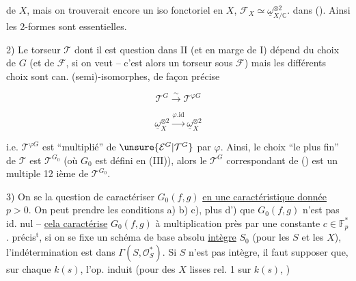 
 de $X$, mais on trouverait encore un iso fonctoriel en $X$, $\mathcal F_X\simeq\underline\omega^{\otimes2}_{X/\mathbb C}$.   dans (). Ainsi les 2-formes sont essentielles.

2)  Le torseur $\mathcal T$ dont il est question dans II (et en marge de I) dépend du choix de $G$ (et de $\mathcal F$, si on veut -- c'est alors un torseur sous $\mathcal F$) mais les  différents choix sont can. (semi)-isomorphes, de façon précise

\[
\mathcal T^G\xrightarrow{\sim}\mathcal T^{\varphi G}
\]


\[
\underline\omega_X^{\otimes2}\xrightarrow{\varphi.\mathrm{id}}\underline\omega_X^{\otimes2}
\]

i.e. $\mathcal T^{\varphi G}$ est ``multiplié'' de $\unsure{\mathcal E^G|\mathcal T^G}$ par $\varphi$. Ainsi, le choix ``le plus fin'' de $\mathcal T$ est $\mathcal T^{G_0}$ (où $G_0$ est défini en (III)), alors le $\mathcal T^G$ correspondant   de () est un multiple 12 ième de $\mathcal T^{G_0}$.

3) On  se   la question de caractériser $G_0(f,g)$ \uline{en une caractéristique donnée} $p>0$. On peut prendre les conditions a)  b) c), plus d') que $G_0(f,g)$ n'est pas id. nul -- \uline{cela caractérise} $G_0(f,g)$ à multiplication près par une constante $c\in\mathbb F_p^*$.  précis$^{\mathrm{t}}$, si on se fixe un schéma de base absolu \uline{intègre} $S_0$ (pour les $S$ et les $X$), l'indétermination est dans $\Gamma(S,\mathcal O_S^*)$. Si $S$ n'est pas intègre, il faut supposer que, sur chaque $k(s)$, l'op. induit (pour des $X$ lisses   rel. 1 sur $k(s)$, )


